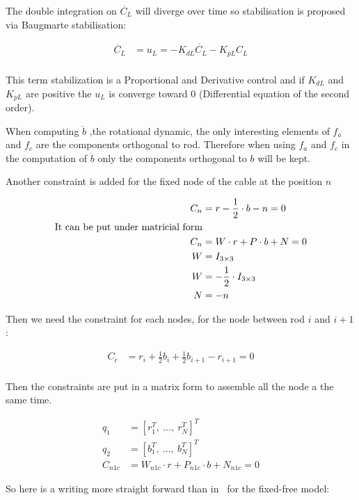 \documentclass[twoside,12pt]{report} %
\begin{document}
The double integration on $\ddot{C_L}$ will diverge over time so stabilisation is proposed via Baugmarte stabilisation:

\begin{align}
\ddot{C_L} &= u_L = -K_{dL} \dot{C_L} - K_{pL} C_L \\
\end{align}

This term stabilization is a Proportional and Derivative control and if $K_{dL}$ and $K_{pL}$ are positive the $u_L$ is converge toward 0 (Differential equation of the second order).

When computing $\ddot{b}$ ,the rotational dynamic, the only interesting elements of $f_a$ and $f_c$ are the components orthogonal to rod. Therefore when using  $f_a$ and $f_c$ in the computation of $\ddot{b}$  only the components orthogonal to $b$ will be kept.

Another constraint is added for the fixed node of the cable at the position $n$

\begin{align}
C_n &= r -\frac{1}{2} \cdot b - n = 0 \nonumber \\
\textnormal{It can be put under matricial form} \nonumber \\
C_n &= W \cdot r + P\cdot b + N = 0 \nonumber  \\
W &= I_{3\times3} \nonumber \\
W &= -\frac{1}{2} \cdot I_{3\times3} \nonumber \\
N &= -n \\
\end{align}

Then we need the constraint for each nodes, for the node between rod $i$ and $i+1$:

\begin{align}
C_c &=  r_i+ \frac{1}{2}  b_i +\frac{1}{2}  b_{i+1} - r_{i+1} =0 \\
\end{align}

Then the constraints are put in a matrix form to assemble all the node a the same time.

\begin{align}
q_1 &= [ r_1^T,~ ..., ~ r_N^T ]^T \nonumber \\
q_2 &= [ b_1^T,~ ..., ~ b_N^T ]^T \nonumber \\
C_{n1c} &= W_{n1c} \cdot r + P_{n1c}\cdot b + N_{n1c} = 0
\end{align}

So here is a writing more straight forward than in~\cite{johansen2007modelling} for the fixed-free model:
\end{document}
